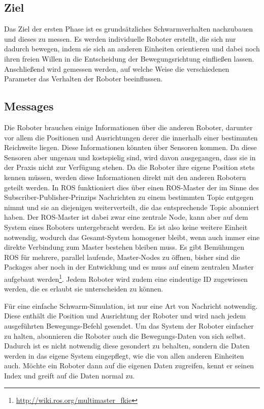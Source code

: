 \subsection*{Ziel}

Das Ziel der ersten Phase ist es grundsätzliches Schwarmverhalten nachzubauen und dieses zu messen. Es werden individuelle Roboter erstellt, die sich nur dadurch bewegen, indem sie sich an anderen Einheiten orientieren und dabei noch ihren freien Willen in die Entscheidung der Bewegungsrichtung einfließen lassen. Anschließend wird gemessen werden, auf welche Weise die verschiedenen Parameter das Verhalten der Roboter beeinflussen.

\subsection*{Messages}\label{subsec:NachbauNachrichten}

Die Roboter brauchen einige Informationen über die anderen Roboter, darunter vor allem die Positionen und Ausrichtungen derer die innerhalb einer bestimmten Reichweite liegen. Diese Informationen könnten über Sensoren kommen. Da diese Sensoren aber ungenau und kostspielig sind, wird davon ausgegangen, dass sie in der Praxis nicht zur Verfügung stehen. Da die Roboter ihre eigene Position stets kennen müssen, werden diese Informationen direkt mit den anderen Robotern geteilt werden.
In ROS funktioniert dies über einen ROS-Master der im Sinne des Subscriber-Publisher-Prinzips Nachrichten zu einem bestimmten Topic entgegen nimmt und sie an diejenigen weiterverteilt, die das entsprechende Topic abonniert haben. Der ROS-Master ist dabei zwar eine zentrale Node, kann aber auf dem System eines Roboters untergebracht werden. Es ist also keine weitere Einheit notwendig, wodurch das Gesamt-System homogener bleibt, wenn auch immer eine direkte Verbindung zum Master bestehen bleiben muss. Es gibt Bemühungen ROS für mehrere, parallel laufende, Master-Nodes zu öffnen, bisher sind die Packages aber noch in der Entwicklung und es muss auf einem zentralen Master aufgebaut werden\footnote{\url{http://wiki.ros.org/multimaster_fkie}}.
Jedem Roboter wird zudem eine eindeutige ID zugewiesen werden, die es erlaubt sie unterscheiden zu können.

Für eine einfache Schwarm-Simulation, ist nur eine Art von Nachricht notwendig. Diese enthält die Position und Ausrichtung der Roboter und wird nach jedem ausgeführten Bewegungs-Befehl gesendet. Um das System der Roboter einfacher zu halten, abonnieren die Roboter auch die Bewegungs-Daten von sich selbst. Dadurch ist es nicht notwendig diese gesondert zu behalten, sondern die Daten werden in das eigene System eingepflegt, wie die von allen anderen Einheiten auch. Möchte ein Roboter dann auf die eigenen Daten zugreifen, kennt er seinen Index und greift auf die Daten normal zu.

